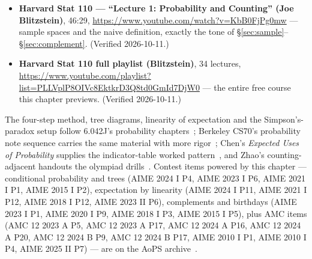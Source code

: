 \begin{rulebox}
\begin{itemize}
\item \textbf{Harvard Stat 110 --- ``Lecture 1: Probability and
Counting'' (Joe Blitzstein)}, 46:29,
\url{https://www.youtube.com/watch?v=KbB0FjPg0mw} --- sample spaces and
the naive definition, exactly the tone of \S\ref{sec:sample}--%
\S\ref{sec:complement}. (Verified 2026-10-11.)
\item \textbf{Harvard Stat 110 full playlist (Blitzstein)}, 34
lectures,
\url{https://www.youtube.com/playlist?list=PLLVplP8OIVc8EktkrD3Q8td0GmId7DjW0}
--- the entire free course this chapter previews.
(Verified 2026-10-11.)
\end{itemize}
\end{rulebox}

\chapternotes
The four-step method, tree diagrams, linearity of expectation and the
Simpson's-paradox setup follow 6.042J's probability
chapters~\cite{mcs}; Berkeley CS70's probability note sequence carries
the same material with more rigor~\cite{cs70}; Chen's \emph{Expected
Uses of Probability} supplies the indicator-table worked
pattern~\cite{chen-expected}, and Zhao's counting-adjacent handouts the
olympiad drills~\cite{zhao}. Contest items powered by this chapter ---
conditional probability and trees (AIME 2024 I P4, AIME 2023 I P6,
AIME 2021 I P1, AIME 2015 I P2), expectation by linearity (AIME 2024 I
P11, AIME 2021 I P12, AIME 2018 I P12, AIME 2023 II P6), complements
and birthdays (AIME 2023 I P1, AIME 2020 I P9, AIME 2018 I P3, AIME
2015 I P5), plus AMC items (AMC 12 2023 A P5, AMC 12 2023 A P17, AMC
12 2024 A P16, AMC 12 2024 A P20, AMC 12 2024 B P9, AMC 12 2024 B
P17, AIME 2010 I P1, AIME 2010 I P4, AIME 2025 II P7) --- are on the
AoPS archive~\cite{aops-amc}.

